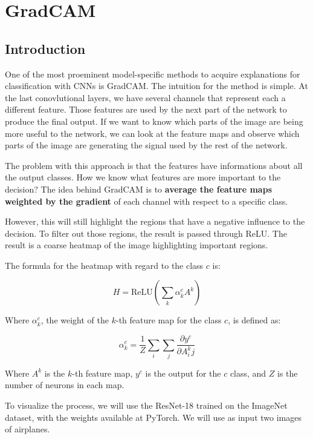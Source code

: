\chapter{GradCAM}

\section{Introduction}

One of the most proeminent model-specific methods to acquire explanations for classification with CNNs is GradCAM. The intuition for the method is simple. At the last conovlutional layers, we have several channels that represent each a different feature. Those features are used by the next part of the network to produce the final output. If we want to know which parts of the image are being more useful to the network, we can look at the feature maps and observe which parts of the image are generating the signal used by the rest of the network. 

The problem with this approach is that the features have informations about all the output classes. How we know what features are more important to the decision? The idea behind GradCAM is to \textbf{average the feature maps weighted by the gradient} of each channel with respect to a specific class. 

However, this will still highlight the regions that have a negative influence to the decision. To filter out those regions, the result is passed through ReLU. The result is a coarse heatmap of the image highlighting important regions.

The formula for the heatmap with regard to the class $c$ is:

\begin{equation}
    H  = \text{ReLU}(\sum_k \alpha_k^c A^k)
    \label{eq:heatmap}
\end{equation}

Where $\alpha_k^c$, the weight of the $k$-th feature map for the class $c$, is defined as:

\begin{equation}
    \alpha_k^c=\frac{1}{Z} \sum_i \sum_j \frac{\partial y^c}{\partial A^k_ij}
    \label{eq:alpha}
\end{equation}

Where $A^k$ is the $k$-th feature map, $y^c$ is the output for the $c$ class, and $Z$ is the number of neurons in each map.

To visualize the process, we will use the ResNet-18 \cite{resnet} trained on the ImageNet dataset, with the weights available at PyTorch. We will use as input two images of airplanes.

